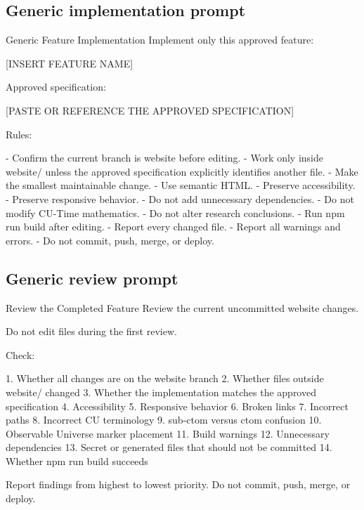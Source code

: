 \documentclass[11pt,letterpaper]{article}
\begin{document}
\subsection{Generic implementation prompt}

\begin{promptbox}{Generic Feature Implementation}
Implement only this approved feature:

[INSERT FEATURE NAME]

Approved specification:

[PASTE OR REFERENCE THE APPROVED SPECIFICATION]

Rules:

- Confirm the current branch is website before editing.
- Work only inside website/ unless the approved specification
  explicitly identifies another file.
- Make the smallest maintainable change.
- Use semantic HTML.
- Preserve accessibility.
- Preserve responsive behavior.
- Do not add unnecessary dependencies.
- Do not modify CU-Time mathematics.
- Do not alter research conclusions.
- Run npm run build after editing.
- Report every changed file.
- Report all warnings and errors.
- Do not commit, push, merge, or deploy.
\end{promptbox}

\subsection{Generic review prompt}

\begin{promptbox}{Review the Completed Feature}
Review the current uncommitted website changes.

Do not edit files during the first review.

Check:

1. Whether all changes are on the website branch
2. Whether files outside website/ changed
3. Whether the implementation matches the approved specification
4. Accessibility
5. Responsive behavior
6. Broken links
7. Incorrect paths
8. Incorrect CU terminology
9. sub-ctom versus ctom confusion
10. Observable Universe marker placement
11. Build warnings
12. Unnecessary dependencies
13. Secret or generated files that should not be committed
14. Whether npm run build succeeds

Report findings from highest to lowest priority.
Do not commit, push, merge, or deploy.
\end{promptbox}

\end{document}
